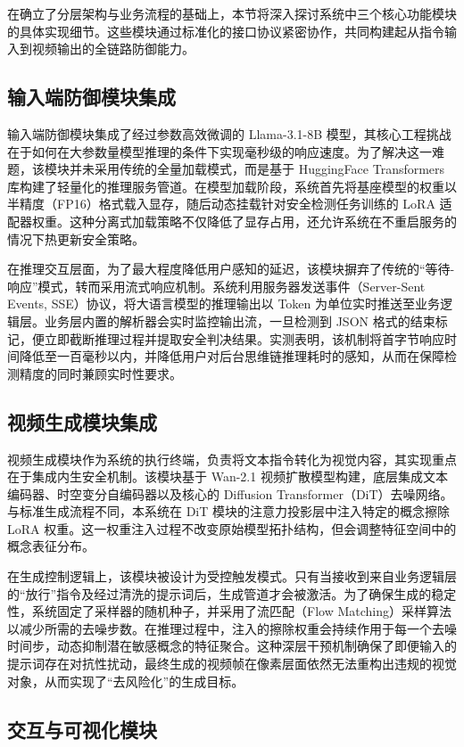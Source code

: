 在确立了分层架构与业务流程的基础上，本节将深入探讨系统中三个核心功能模块的具体实现细节。这些模块通过标准化的接口协议紧密协作，共同构建起从指令输入到视频输出的全链路防御能力。

\subsection{输入端防御模块集成}

输入端防御模块集成了经过参数高效微调的 Llama-3.1-8B 模型，其核心工程挑战在于如何在大参数量模型推理的条件下实现毫秒级的响应速度。为了解决这一难题，该模块并未采用传统的全量加载模式，而是基于 HuggingFace Transformers 库构建了轻量化的推理服务管道。在模型加载阶段，系统首先将基座模型的权重以半精度（FP16）格式载入显存，随后动态挂载针对安全检测任务训练的 LoRA 适配器权重。这种分离式加载策略不仅降低了显存占用，还允许系统在不重启服务的情况下热更新安全策略。

在推理交互层面，为了最大程度降低用户感知的延迟，该模块摒弃了传统的“等待-响应”模式，转而采用流式响应机制。系统利用服务器发送事件（Server-Sent Events, SSE）协议，将大语言模型的推理输出以 Token 为单位实时推送至业务逻辑层。业务层内置的解析器会实时监控输出流，一旦检测到 JSON 格式的结束标记，便立即截断推理过程并提取安全判决结果。实测表明，该机制将首字节响应时间降低至一百毫秒以内，并降低用户对后台思维链推理耗时的感知，从而在保障检测精度的同时兼顾实时性要求。

\subsection{视频生成模块集成}

视频生成模块作为系统的执行终端，负责将文本指令转化为视觉内容，其实现重点在于集成内生安全机制。该模块基于 Wan-2.1 视频扩散模型构建，底层集成文本编码器、时空变分自编码器以及核心的 Diffusion Transformer（DiT）去噪网络。与标准生成流程不同，本系统在 DiT 模块的注意力投影层中注入特定的概念擦除 LoRA 权重。这一权重注入过程不改变原始模型拓扑结构，但会调整特征空间中的概念表征分布。

在生成控制逻辑上，该模块被设计为受控触发模式。只有当接收到来自业务逻辑层的“放行”指令及经过清洗的提示词后，生成管道才会被激活。为了确保生成的稳定性，系统固定了采样器的随机种子，并采用了流匹配（Flow Matching）采样算法以减少所需的去噪步数。在推理过程中，注入的擦除权重会持续作用于每一个去噪时间步，动态抑制潜在敏感概念的特征聚合。这种深层干预机制确保了即便输入的提示词存在对抗性扰动，最终生成的视频帧在像素层面依然无法重构出违规的视觉对象，从而实现了“去风险化”的生成目标。

\subsection{交互与可视化模块}

